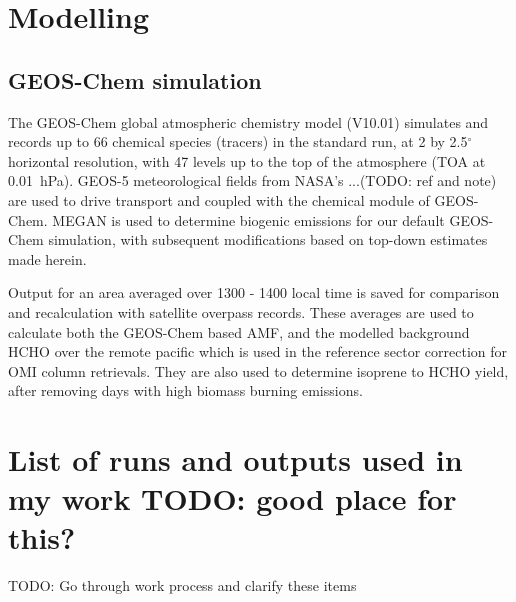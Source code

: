 \section{Modelling}
  \label{BioIsop:Model}

  \subsection{GEOS-Chem simulation}
    \label{BioIsop:Model:GC}
    The GEOS-Chem global atmospheric chemistry model (V10.01) simulates and records up to 66 chemical species (tracers) in the standard run, at 2 by 2.5$^{\circ}$ horizontal resolution, with 47 levels up to the top of the atmosphere (TOA at 0.01~hPa). 
    GEOS-5 meteorological fields from NASA's ...(TODO: ref and note) are used to drive transport and coupled with the chemical module of GEOS-Chem.
    MEGAN is used to determine biogenic emissions for our default GEOS-Chem simulation, with subsequent modifications based on top-down estimates made herein.
    
    Output for an area averaged over 1300 - 1400 local time is saved for comparison and recalculation with satellite overpass records.
    These averages are used to calculate both the GEOS-Chem based AMF, and the modelled background HCHO over the remote pacific which is used in the reference sector correction for OMI column retrievals.
    They are also used to determine isoprene to HCHO yield, after removing days with high biomass burning emissions.

  

\section{List of runs and outputs used in my work TODO: good place for this?}
  TODO: Go through work process and clarify these items
